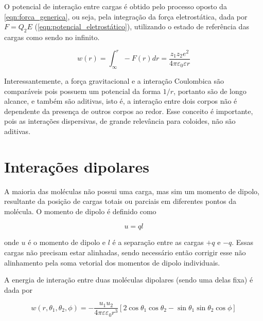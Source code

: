 	O potencial de interação entre cargas é obtido pelo processo oposto da \autoref{eqn:forca_generica}, ou seja, pela integração da força eletrostática, dada por \(F = Q_2 E\) (\autoref{eqn:potencial_eletrostático}), utilizando o estado de referência das cargas como sendo no infinito.
	
	\begin{equation}
		w(r) = \int_\infty^r -F(r)dr = \dfrac{z_1z_2e^2}{4\pi\varepsilon_0\varepsilon r}
		\label{eqn:potencial_eletrostático}
	\end{equation} 
	
	Interessantemente, a força gravitacional e a interação Coulombica são comparáveis pois possuem um potencial da forma \(1/r\), portanto são de longo alcance, e também são aditivas, isto é, a interação entre dois corpos não é dependente da presença de outros corpos ao redor. Esse conceito é importante, pois as interações dispersivas, de grande relevância para coloides, não são aditivas.
	
	\section{Interações dipolares} 
	
	A maioria das moléculas não possui uma carga, mas sim um momento de dipolo, resultante da posição de cargas totais ou parciais em diferentes pontos da molécula. O momento de dipolo é definido como
	
	\begin{equation}
		u = ql
		\label{eqn:momento_dipolo}
	\end{equation} 
	
	\noindent onde \(u\) é o momento de dipolo e \(l\) é a separação entre as cargas \(+q\) e \(-q\). Essas cargas não precisam estar alinhadas, sendo necessário então corrigir esse não alinhamento pela soma vetorial dos momentos de dipolo individuais.
	
	A energia de interação entre duas moléculas dipolares (sendo uma delas fixa) é dada por
	
	\begin{equation}
		w \left( r , \theta _ { 1 } , \theta _ { 2 } , \phi \right) = - \frac { u _ { 1 } u _ { 2 } } { 4 \pi \varepsilon \varepsilon _ { 0 } r ^ { 3 } } \left[ 2 \cos \theta _ { 1 } \cos \theta _ { 2 } - \sin \theta _ { 1 } \sin \theta _ { 2 } \cos \phi \right]
		\label{eqn:energia_dipolo_dipolo}
	\end{equation} 
	
